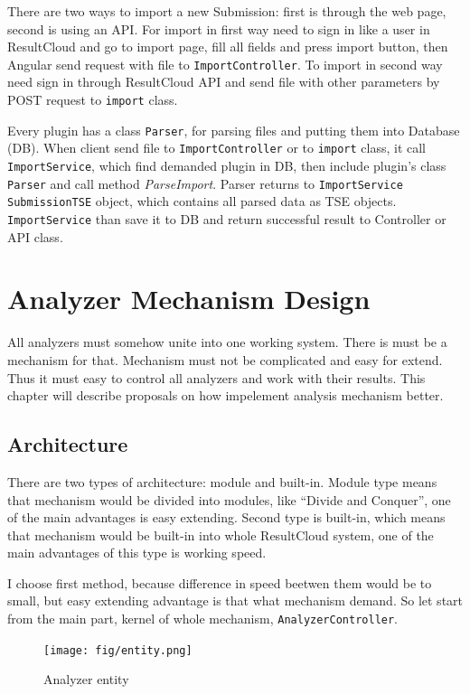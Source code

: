 There are two ways to import a new Submission: first is through the web page, second is using an API. For import in first way need to sign in like a user in ResultCloud and go to import page, fill all fields and press import button, then Angular send request with file to \texttt{ImportController}. To import in second way need sign in through ResultCloud API and send file with other parameters by POST request to \texttt{import} class. 

Every plugin has a class \texttt{Parser}, for parsing files and putting them into Database (DB). When client send file to \texttt{ImportController} or to \texttt{import} class, it call \texttt{ImportService}, which find demanded plugin in DB, then include plugin's class \texttt{Parser} and call method \emph{ParseImport}. Parser returns to \texttt{ImportService} \texttt{SubmissionTSE} object, which contains all parsed data as TSE objects. \texttt{ImportService} than save it to DB and return successful result to Controller or API class.

\chapter{Analyzer Mechanism Design}
\label{ch:analyzer_proposal}

All analyzers must somehow unite into one working system. There is must be a mechanism for that. Mechanism must not be complicated and easy for extend. Thus it must easy to control all analyzers and work with their results. This chapter will describe proposals on how impelement analysis mechanism better.

\section{Architecture} 

There are two types of architecture: module and built-in. Module type means that mechanism would be divided into modules, like “Divide and Conquer”, one of the main advantages is easy extending. Second type is built-in, which means that mechanism would be built-in into whole ResultCloud system, one of the main advantages of this type is working speed.

I choose first method, because difference in speed beetwen them would be to small, but easy extending advantage is that what mechanism demand. So let start from the main part, kernel of whole mechanism, \texttt{AnalyzerController}. 

\begin{figure}
  \centering
    \texttt{[image: fig/entity.png]}
  \caption{Analyzer entity}
  \label{fig:entity}
\end{figure}


